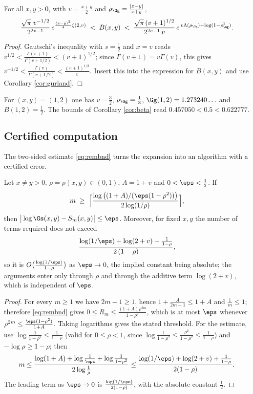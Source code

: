\begin{corollary}\label{cor:beta}
For all $x,y>0$, with $v=\frac{x+y}{2}$ and $\rho_{\Gg}=\frac{|x-y|}{x+y}$,
\[
  \frac{\sqrt\pi\;v^{-1/2}}{2^{2v-1}}\,
   e^{\frac{(x-y)^{2}}{4}\zeta(2,v)}
  \;<\;B(x,y)\;<\;
  \frac{\sqrt\pi\,(v+1)^{1/2}}{2^{2v-1}\,v}\,
   e^{\,v\Lambda(\rho_{\Gg})-\log(1-\rho_{\Gg}^{2})}.
\]
\end{corollary}

\begin{proof}
Gautschi's inequality with $s=\frac12$ and $x=v$ reads
$v^{1/2}<\frac{\Gamma(v+1)}{\Gamma(v+1/2)}<(v+1)^{1/2}$; since $\Gamma(v+1)=v\Gamma(v)$,
this gives $v^{-1/2}<\frac{\Gamma(v)}{\Gamma(v+1/2)}<\frac{(v+1)^{1/2}}{v}$. Insert this
into the expression for $B(x,y)$ and use Corollary \ref{cor:gurland}.
\end{proof}

\begin{example}
For $(x,y)=(1,2)$ one has $v=\frac32$, $\rho_{\Gg}=\frac13$, $\Gg(1,2)=1.273240\ldots$
and $B(1,2)=\frac12$. The bounds of Corollary \ref{cor:beta} read
$0.457050<0.5<0.622777$.
\end{example}

\subsection{Certified computation}
The two-sided estimate \eqref{eq:rembnd} turns the expansion into an algorithm with a
certified error.

\begin{corollary}\label{cor:alg}
Let $x\ne y>0$, $\rho=\rho(x,y)\in(0,1)$, $A=1+v$ and $0<\eps<\tfrac12$. If
\[
  m\;\ge\;\Big\lceil\frac{\log\big((1+A)/(\eps(1-\rho^{2}))\big)}{2\log(1/\rho)}\Big\rceil ,
\]
then $\big|\log\Gs(x,y)-S_m(x,y)\big|\le\eps$. Moreover, for fixed $x,y$ the number of
terms required does not exceed
\[
  \frac{\log(1/\eps)+\log(2+v)+\frac{1}{1-\rho}}{2\,(1-\rho)},
\]
so it is $O\big(\frac{\log(1/\eps)}{1-\rho}\big)$ as $\eps\to0$, the implied constant
being absolute; the arguments enter only through $\rho$ and through the additive
term $\log(2+v)$, which is independent of $\eps$.
\end{corollary}

\begin{proof}
For every $m\ge1$ we have $2m-1\ge1$, hence $1+\frac{A}{2m-1}\le1+A$ and $\frac1m\le1$;
therefore \eqref{eq:rembnd} gives
$0\le R_m\le\frac{(1+A)\rho^{2m}}{1-\rho^{2}}$, which is at most $\eps$ whenever
$\rho^{2m}\le\frac{\eps(1-\rho^{2})}{1+A}$. Taking logarithms gives the stated threshold.
For the estimate, use $\log\frac{1}{1-\rho^{2}}\le\frac{1}{1-\rho}$ (valid for
$0\le\rho<1$, since $\log\frac1{1-\rho^2}\le\frac{\rho^2}{1-\rho^2}\le\frac1{1-\rho}$) and
$-\log\rho\ge1-\rho$; then
\[
  m\le\frac{\log(1+A)+\log\frac1\eps+\log\frac{1}{1-\rho^{2}}}{2\log\frac1\rho}
  \le\frac{\log(1/\eps)+\log(2+v)+\frac{1}{1-\rho}}{2(1-\rho)} .
\]
The leading term as $\eps\to0$ is $\frac{\log(1/\eps)}{2(1-\rho)}$, with the absolute
constant $\frac12$.
\end{proof}

